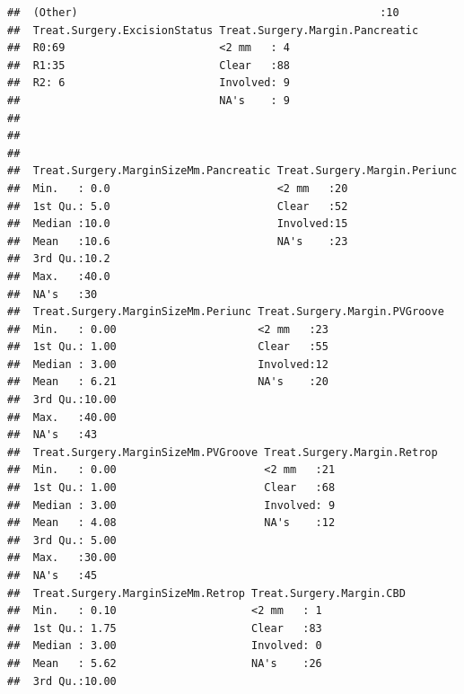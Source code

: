 \documentclass{article}\usepackage[]{graphicx}\usepackage[]{color}
\makeatletter
\newenvironment{kframe}{%
 \def\at@end@of@kframe{}%
 \ifinner\ifhmode%
  \def\at@end@of@kframe{\end{minipage}}%
  \begin{minipage}{\columnwidth}%
 \fi\fi%
 \def\FrameCommand##1{\hskip\@totalleftmargin \hskip-\fboxsep
 \colorbox{shadecolor}{##1}\hskip-\fboxsep
     \hskip-\linewidth \hskip-\@totalleftmargin \hskip\columnwidth}%
 \MakeFramed {\advance\hsize-\width
   \@totalleftmargin\z@ \linewidth\hsize
   \@setminipage}}%
 {\par\unskip\endMakeFramed%
 \at@end@of@kframe}
\newenvironment{knitrout}{}{} %
\makeatother
\begin{document}
\begin{knitrout}
\begin{kframe}
\begin{verbatim}
##  (Other)                                               :10        
##  Treat.Surgery.ExcisionStatus Treat.Surgery.Margin.Pancreatic
##  R0:69                        <2 mm   : 4                    
##  R1:35                        Clear   :88                    
##  R2: 6                        Involved: 9                    
##                               NA's    : 9                    
##                                                              
##                                                              
##                                                              
##  Treat.Surgery.MarginSizeMm.Pancreatic Treat.Surgery.Margin.Periunc
##  Min.   : 0.0                          <2 mm   :20                 
##  1st Qu.: 5.0                          Clear   :52                 
##  Median :10.0                          Involved:15                 
##  Mean   :10.6                          NA's    :23                 
##  3rd Qu.:10.2                                                      
##  Max.   :40.0                                                      
##  NA's   :30                                                        
##  Treat.Surgery.MarginSizeMm.Periunc Treat.Surgery.Margin.PVGroove
##  Min.   : 0.00                      <2 mm   :23                  
##  1st Qu.: 1.00                      Clear   :55                  
##  Median : 3.00                      Involved:12                  
##  Mean   : 6.21                      NA's    :20                  
##  3rd Qu.:10.00                                                   
##  Max.   :40.00                                                   
##  NA's   :43                                                      
##  Treat.Surgery.MarginSizeMm.PVGroove Treat.Surgery.Margin.Retrop
##  Min.   : 0.00                       <2 mm   :21                
##  1st Qu.: 1.00                       Clear   :68                
##  Median : 3.00                       Involved: 9                
##  Mean   : 4.08                       NA's    :12                
##  3rd Qu.: 5.00                                                  
##  Max.   :30.00                                                  
##  NA's   :45                                                     
##  Treat.Surgery.MarginSizeMm.Retrop Treat.Surgery.Margin.CBD
##  Min.   : 0.10                     <2 mm   : 1             
##  1st Qu.: 1.75                     Clear   :83             
##  Median : 3.00                     Involved: 0             
##  Mean   : 5.62                     NA's    :26             
##  3rd Qu.:10.00                                             

\end{verbatim}
\end{kframe}
\end{knitrout}
\end{document}
